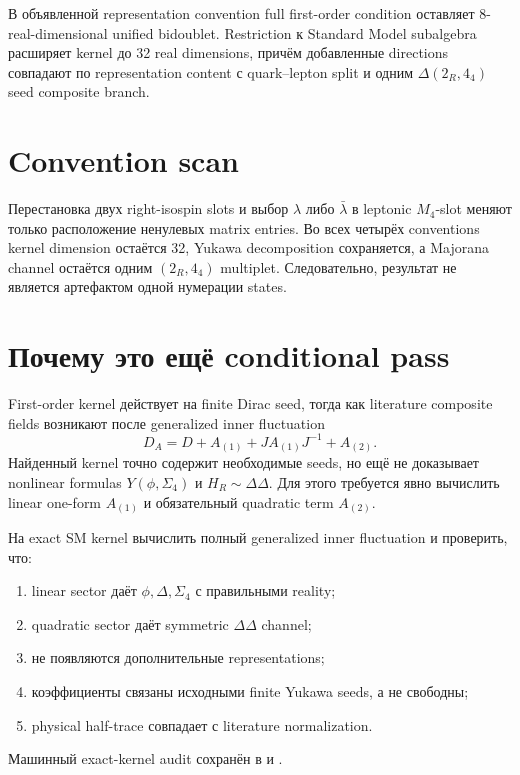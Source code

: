 \begin{theorem}
В объявленной representation convention full first-order condition оставляет
8-real-dimensional unified bidoublet. Restriction к Standard Model
subalgebra расширяет kernel до 32 real dimensions, причём добавленные
directions совпадают по representation content с quark--lepton split и
одним \(\Delta(2_R,4_4)\) seed composite branch.
\end{theorem}

\section{Convention scan}

Перестановка двух right-isospin slots и выбор \(\lambda\) либо
\(\bar\lambda\) в leptonic \(M_4\)-slot меняют только расположение ненулевых
matrix entries. Во всех четырёх conventions kernel dimension остаётся 32,
Yukawa decomposition сохраняется, а Majorana channel остаётся одним
\((2_R,4_4)\) multiplet. Следовательно, результат не является артефактом
одной нумерации states.

\section{Почему это ещё conditional pass}

First-order kernel действует на finite Dirac seed, тогда как literature
composite fields возникают после generalized inner fluctuation
\begin{equation}
 D_A=D+A_{(1)}+JA_{(1)}J^{-1}+A_{(2)}.
\end{equation}
Найденный kernel точно содержит необходимые seeds, но ещё не доказывает
nonlinear formulas \(Y(\phi,\Sigma_4)\) и
\(H_R\sim\Delta\Delta\). Для этого требуется явно вычислить linear one-form
\(A_{(1)}\) и обязательный quadratic term \(A_{(2)}\).

\begin{protocol}
На exact SM kernel вычислить полный generalized inner fluctuation и
проверить, что:
\begin{enumerate}
 \item linear sector даёт \(\phi,\Delta,\Sigma_4\) с правильными reality;
 \item quadratic sector даёт symmetric \(\Delta\Delta\) channel;
 \item не появляются дополнительные representations;
 \item коэффициенты связаны исходными finite Yukawa seeds, а не свободны;
 \item physical half-trace совпадает с literature normalization.
\end{enumerate}
\end{protocol}

Машинный exact-kernel audit сохранён в
 и
.